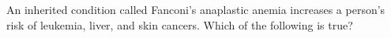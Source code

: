 
An inherited condition called Fanconi's anaplastic anemia increases a person's risk of leukemia, liver, and skin cancers.  Which of the following is true?
\begin{MultipleChoice}
\end{MultipleChoice}